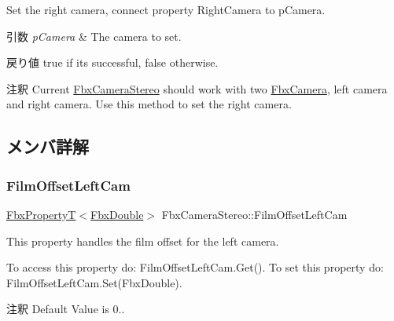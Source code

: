 Set the right camera, connect property Right\+Camera to p\+Camera. 
\begin{DoxyParams}{引数}
{\em p\+Camera} & The camera to set. \\
\hline
\end{DoxyParams}
\begin{DoxyReturn}{戻り値}
{\ttfamily true} if it\textquotesingle{}s successful, {\ttfamily false} otherwise. 
\end{DoxyReturn}
\begin{DoxyRemark}{注釈}
Current \hyperlink{class_fbx_camera_stereo}{Fbx\+Camera\+Stereo} should work with two \hyperlink{class_fbx_camera}{Fbx\+Camera}, left camera and right camera. Use this method to set the right camera. 
\end{DoxyRemark}


\subsection{メンバ詳解}
\mbox{\label{class_fbx_camera_stereo_adfb0e61258f415bd4e80d2a74071d2b5}} 
\subsubsection{\texorpdfstring{Film\+Offset\+Left\+Cam}{FilmOffsetLeftCam}}
{\footnotesize\ttfamily \hyperlink{class_fbx_property_t}{Fbx\+PropertyT}$<$\hyperlink{fbxtypes_8h_a171e72a1c46fc15c1a6c9c31948c1c5b}{Fbx\+Double}$>$ Fbx\+Camera\+Stereo\+::\+Film\+Offset\+Left\+Cam}

This property handles the film offset for the left camera.

To access this property do\+: Film\+Offset\+Left\+Cam.\+Get(). To set this property do\+: Film\+Offset\+Left\+Cam.\+Set(\+Fbx\+Double).

\begin{DoxyRemark}{注釈}
Default Value is 0.. 
\end{DoxyRemark}
\mbox{\label{class_fbx_camera_stereo_a91f409fc6af89147826e7eb0aae87184}} 
